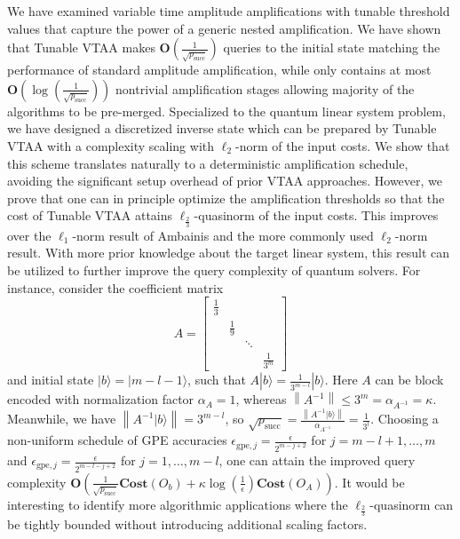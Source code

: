 \documentclass[letterpaper,onecolumn,11pt,accepted=2026-02-14]{quantumarticle}
\newcommand{\norm}[1]{\left\lVert#1\right\rVert}
\theoremstyle{remark}
\theoremstyle{plain}
\newcommand{\ket}[1]{|#1\rangle}
\begin{document}
We have examined variable time amplitude amplifications with tunable threshold values that capture the power of a generic nested amplification. We have shown that Tunable VTAA makes $\mathbf{O}\left(\frac{1}{\sqrt{p_{\text{succ}}}}\right)$ queries to the initial state matching the performance of standard amplitude amplification, while only contains at most $\mathbf{O}\left(\log\left(\frac{1}{\sqrt{p_{\text{succ}}}}\right)\right)$ nontrivial amplification stages allowing majority of the algorithms to be pre-merged.
Specialized to the quantum linear system problem, we have designed a discretized inverse state which can be prepared by Tunable VTAA with a complexity scaling with $\ell_2$-norm of the input costs. We show that this scheme translates naturally to a deterministic amplification schedule, avoiding the significant setup overhead of prior VTAA approaches. However, we prove that one can in principle optimize the amplification thresholds so that the cost of Tunable VTAA attains $\ell_{\frac{2}{3}}$-quasinorm of the input costs. This improves over the $\ell_1$-norm result of Ambainis and the more commonly used $\ell_2$-norm result. 
With more prior knowledge about the target linear system, this result can be utilized to further improve the query complexity of quantum solvers. For instance, consider the coefficient matrix
\begin{equation}
A=
\begin{bmatrix}
    \frac{1}{3} & & &\\
    & \frac{1}{9} & &\\
    & & \ddots &\\
    & & & \frac{1}{3^m}
\end{bmatrix}
\end{equation}
and initial state $\ket{b}=\ket{m-l-1}$, such that $A\ket{b}=\frac{1}{3^{m-l}}\ket{b}$. Here $A$ can be block encoded with normalization factor $\alpha_A=1$, whereas $\norm{A^{-1}}\leq 3^m=\alpha_{A^{-1}}=\kappa$. Meanwhile, we have $\norm{A^{-1}\ket{b}}=3^{m-l}$, so $\sqrt{p_{\text{succ}}}=\frac{\norm{A^{-1}\ket{b}}}{\alpha_{A^{-1}}}=\frac{1}{3^l}$. Choosing a non-uniform schedule of GPE accuracies $\epsilon_{\text{gpe},j}=\frac{\epsilon}{2^{m-j+2}}$ for $j=m-l+1,\ldots,m$ and $\epsilon_{\text{gpe},j}=\frac{\epsilon}{2^{m-l-j+2}}$ for $j=1,\ldots,m-l$, one can attain the improved query complexity $\mathbf{O}\left(\frac{1}{\sqrt{p_{\text{succ}}}}\mathbf{Cost}(O_b)
    +\kappa\log\left(\frac{1}{\epsilon}\right)\mathbf{Cost}\left(O_A\right)\right)$.
It would be interesting to identify more algorithmic applications where the $\ell_{\frac{2}{3}}$-quasinorm can be tightly bounded without introducing additional scaling factors.
\end{document}
